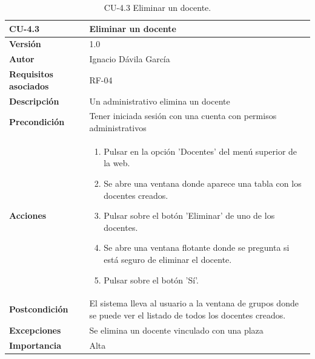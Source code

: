 \begin{table}[p]
	\centering
	\begin{tabularx}{\linewidth}{ p{} p{} }
		\toprule
		\textbf{CU-4.3}    & \textbf{Eliminar un docente}\\
		\toprule
		\textbf{Versión}              & 1.0    \\
		\textbf{Autor}                & Ignacio Dávila García \\
		\textbf{Requisitos asociados} & RF-04 \\
		\textbf{Descripción}          & Un administrativo elimina un docente \\
		\textbf{Precondición}         & Tener iniciada sesión con una cuenta con permisos administrativos \\
		\textbf{Acciones}             &
		\begin{enumerate}
			\def\labelenumi{\arabic{enumi}.}
			\tightlist
			\item Pulsar en la opción 'Docentes' del menú superior de la web.
			\item Se abre una ventana donde aparece una tabla con los docentes creados.
			\item Pulsar sobre el botón 'Eliminar' de uno de los docentes.
			\item Se abre una ventana flotante donde se pregunta si está seguro de eliminar el docente.
			\item Pulsar sobre el botón 'Sí'.
		\end{enumerate}\\
		\textbf{Postcondición}        & El sistema lleva al usuario a la ventana de grupos donde se puede ver el listado de todos los docentes creados. \\
		\textbf{Excepciones}          & Se elimina un docente vinculado con una plaza \\
		\textbf{Importancia}          & Alta \\
		\bottomrule
	\end{tabularx}
	\caption{CU-4.3 Eliminar un docente.}
\end{table}

